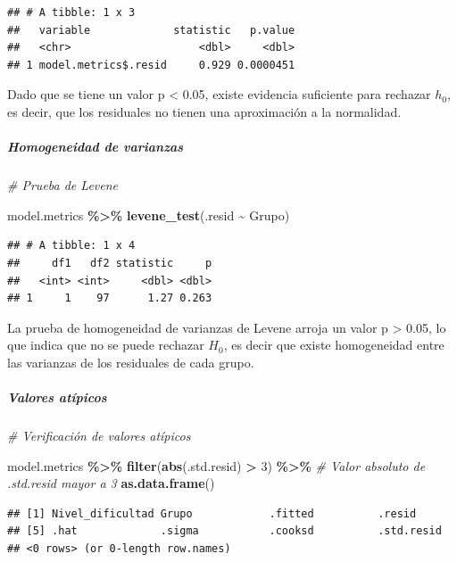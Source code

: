\documentclass[
]{article}
\newenvironment{Shaded}{\begin{snugshade}}{\end{snugshade}}
\newcommand{\CommentTok}[1]{\textcolor[rgb]{0.56,0.35,0.01}{\textit{#1}}}
\newcommand{\DecValTok}[1]{\textcolor[rgb]{0.00,0.00,0.81}{#1}}
\newcommand{\FunctionTok}[1]{\textcolor[rgb]{0.13,0.29,0.53}{\textbf{#1}}}
\newcommand{\NormalTok}[1]{#1}
\newcommand{\SpecialCharTok}[1]{\textcolor[rgb]{0.81,0.36,0.00}{\textbf{#1}}}
\begin{document}
\begin{verbatim}
## # A tibble: 1 x 3
##   variable             statistic   p.value
##   <chr>                    <dbl>     <dbl>
## 1 model.metrics$.resid     0.929 0.0000451
\end{verbatim}

Dado que se tiene un valor p \textless{} 0.05, existe evidencia
suficiente para rechazar \(h_0\), es decir, que los residuales no tienen
una aproximación a la normalidad.

\hypertarget{homogeneidad-de-varianzas}{%
\subparagraph{Homogeneidad de
varianzas}\label{homogeneidad-de-varianzas}}

\begin{Shaded}
\begin{Highlighting}[]
\CommentTok{\# Prueba de Levene}

\NormalTok{model.metrics }\SpecialCharTok{\%\textgreater{}\%} \FunctionTok{levene\_test}\NormalTok{(.resid }\SpecialCharTok{\textasciitilde{}}\NormalTok{ Grupo)}
\end{Highlighting}
\end{Shaded}

\begin{verbatim}
## # A tibble: 1 x 4
##     df1   df2 statistic     p
##   <int> <int>     <dbl> <dbl>
## 1     1    97      1.27 0.263
\end{verbatim}

La prueba de homogeneidad de varianzas de Levene arroja un valor p
\textgreater{} 0.05, lo que indica que no se puede rechazar \(H_0\), es
decir que existe homogeneidad entre las varianzas de los residuales de
cada grupo.

\hypertarget{valores-atuxedpicos}{%
\subparagraph{Valores atípicos}\label{valores-atuxedpicos}}

\begin{Shaded}
\begin{Highlighting}[]
\CommentTok{\# Verificación de valores atípicos}

\NormalTok{model.metrics }\SpecialCharTok{\%\textgreater{}\%} 
  \FunctionTok{filter}\NormalTok{(}\FunctionTok{abs}\NormalTok{(.std.resid) }\SpecialCharTok{\textgreater{}} \DecValTok{3}\NormalTok{) }\SpecialCharTok{\%\textgreater{}\%}   \CommentTok{\# Valor absoluto de .std.resid mayor a 3}
  \FunctionTok{as.data.frame}\NormalTok{()                  }
\end{Highlighting}
\end{Shaded}

\begin{verbatim}
## [1] Nivel_dificultad Grupo            .fitted          .resid          
## [5] .hat             .sigma           .cooksd          .std.resid      
## <0 rows> (or 0-length row.names)
\end{verbatim}
\end{document}

